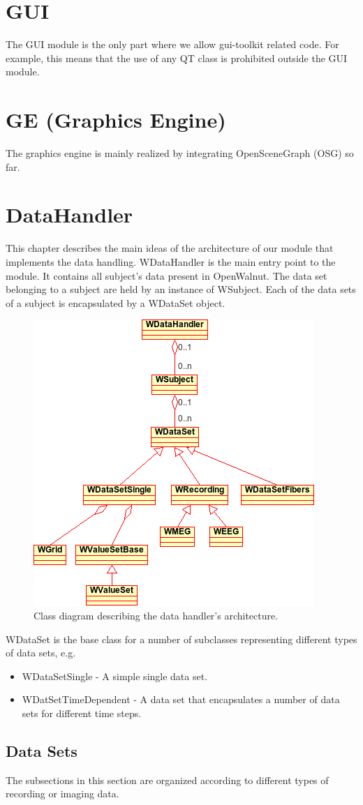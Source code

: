 \documentclass[a4paper,12pt]{scrbook}
\begin{document}
\chapter{GUI}
The GUI module is the only part where we allow gui-toolkit related code. For example, this means that the use of any QT class is
prohibited outside the GUI module.
\chapter{GE (Graphics Engine)}
The graphics engine is mainly realized by integrating OpenSceneGraph (OSG) so far.
\chapter{DataHandler}
This chapter describes the main ideas of the architecture of our module that implements the data handling. WDataHandler is the
main entry point to the module. It contains all subject's data present in OpenWalnut. The data set belonging to a subject are held by
an instance of WSubject. Each of the data sets of a subject is encapsulated by a WDataSet object. 

\begin{figure}[htb]
  \centering
  \includegraphics[width=.4\textwidth]{dataHandler_classDiagram}
  \caption{Class diagram describing the data handler's architecture.}
\end{figure}

WDataSet is the base class for a number of subclasses representing different types of data sets, e.g.
\begin{itemize}
\item WDataSetSingle - A simple single data set.
\item WDatSetTimeDependent - A data set that encapsulates a number of data sets for different time steps.
\end{itemize}

\section{Data Sets}
The subsections in this section are organized according to different types of recording or imaging data.
\end{document}
